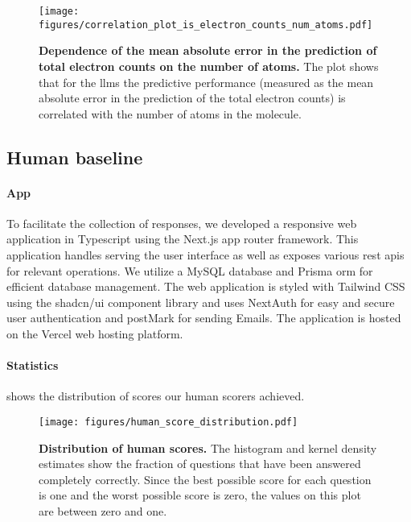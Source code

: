 \begin{figure}
    \centering
    \texttt{[image: figures/correlation\_plot\_is\_electron\_counts\_num\_atoms.pdf]}
    \caption{\textbf{Dependence of the mean absolute error in the prediction of total electron counts on the number of atoms.} The plot shows that for the \glspl{llm} the predictive performance (measured as the mean absolute error in the prediction of the total electron counts) is correlated with the number of atoms in the molecule.}
    \label{fig:correlation_plot_is_electron_counts_num_atoms}
\end{figure}



\subsection{Human baseline}
\paragraph{App} To facilitate the collection of responses, we developed a responsive web application in Typescript using the Next.js\autocite{nextjs} app router framework.
This application handles serving the user interface as well as exposes various \gls{rest} \glspl{api} for relevant operations.
We utilize a MySQL\autocite{mysql} database and Prisma \gls{orm}\autocite{prisma} for efficient database management.
The web application is styled with Tailwind CSS\autocite{tailwindcss} using the shadcn/ui component library and uses NextAuth\autocite{nextauth} for easy and secure user authentication and postMark for sending Emails.
The application is hosted on the Vercel web hosting platform.


\paragraph{Statistics}
 shows the distribution of scores our human scorers achieved.

\begin{figure}[htb]
    \centering
    \texttt{[image: figures/human\_score\_distribution.pdf]}
    \label{fig:human_score_distribution}
    \caption{\textbf{Distribution of human scores.} The histogram and kernel density estimates show the fraction of questions that have been answered completely correctly.
    Since the best possible score for each question is one and the worst possible score is zero, the values on this plot are between zero and one.}
\end{figure}

